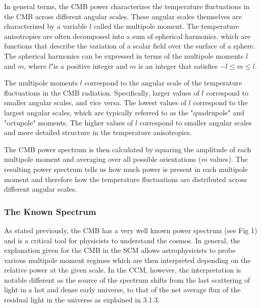\documentclass[a4paper]{article}
\begin{document}
    In general terms, the CMB power characterizes the temperature fluctuations
    in the CMB across different angular scales. These angular scales themselves
    are characterized by a variable $l$ called the multipole moment. The
    temperature anisotropies are often decomposed into a sum of spherical
    harmonics, which are functions that describe the variation of a scalar
    field over the surface of a sphere. The spherical harmonics can be
    expressed in terms of the multipole moments $l$ and $m$, where $l$"is a
    positive integer and $m$ is an integer that satisfies $-l \leq m \leq l$.

    The multipole moments $l$ correspond to the angular scale of the
    temperature fluctuations in the CMB radiation. Specifically, larger values
    of $l$ correspond to smaller angular scales, and vice versa. The lowest
    values of $l$ correspond to the largest angular scales, which are typically
    referred to as the "quadrupole" and "octupole" moments. The higher values
    of $l$ correspond to smaller angular scales and more detailed structure in
    the temperature anisotropies.
    
    The CMB power spectrum is then calculated by squaring the amplitude of each
    multipole moment and averaging over all possible orientations ($m$ values).
    The resulting power spectrum tells us how much power is present in each
    multipole moment and therefore how the temperature fluctuations are
    distributed across different angular scales.


    \subsubsection{The Known Spectrum}
    As stated previously, the CMB has a very well known power spectrum (see Fig
    1) and is a critical tool for physicists to understand the cosmos. In
    general, the explanation given for the CMB in the SCM allows
    astrophysicists to probe various multipole moment regimes which are then
    interpreted depending on the relative power at the given scale. In the CCM,
    however, the interpretation is notable different as the source of the
    spectrum shifts from the last scattering of light in a hot and dense early
    universe, to that of the net average flux of the residual light in the
    universe as explained in 3.1.3.
    
\end{document}
